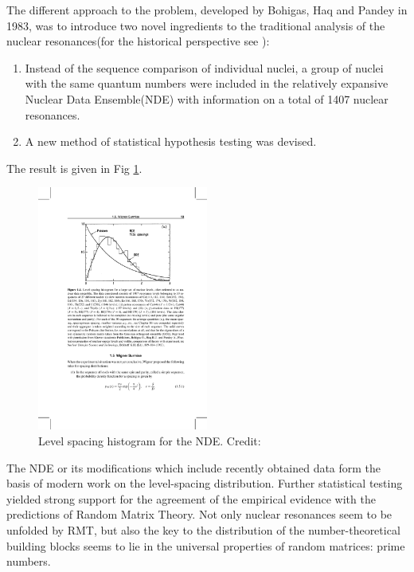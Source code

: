The different approach to the problem, developed by Bohigas, Haq and Pandey\cite{ga61} in 1983, was to introduce two novel ingredients to the traditional analysis of the nuclear resonances(for the historical perspective see \cite{mezz}): 
\begin{enumerate}
\item Instead of the sequence comparison of individual nuclei, a group of nuclei with the same quantum numbers were included in the relatively expansive Nuclear Data Ensemble(NDE) with information on a total of 1407 nuclear resonances.
\item A new method of statistical hypothesis testing was devised.
\end{enumerate}
The result is given in Fig \ref{fig:4}.
\begin{figure}[H]
\includegraphics[width=0.5\textwidth]{4}
\centering
\caption{Level spacing histogram for the NDE. Credit:\cite{ga61}}
\label{fig:4}
\end{figure}
The NDE or its modifications which include recently obtained data form the basis of modern work on the level-spacing distribution.\cite{wei14} Further statistical testing yielded strong support for the agreement of the empirical evidence with the predictions of Random Matrix Theory.\cite{lom94}  Not only nuclear resonances seem to be unfolded by RMT, but also the key to the distribution of the number-theoretical building blocks seems to lie in the universal properties of random matrices: prime numbers.
